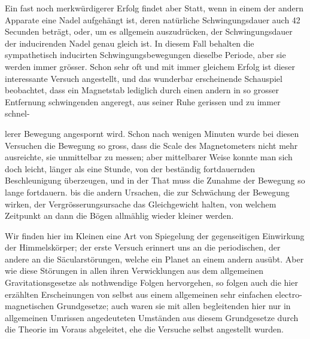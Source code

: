 Ein fast noch merkwürdigerer Erfolg findet aber Statt, wenn in einem der andern Apparate eine Nadel aufgehängt ist, deren natürliche Schwingungsdauer auch 42 Secunden beträgt, oder, um es allgemein auszudrücken, der Schwingungsdauer der inducirenden Nadel genau gleich ist. In diesem Fall behalten die sympathetisch inducirten Schwingungsbewegungen dieselbe Periode, aber sie werden immer grösser. Schon sehr oft und mit immer gleichem Erfolg ist dieser interessante Versuch angestellt, und das wunderbar erscheinende Schauspiel beobachtet, dass ein Magnetstab lediglich durch einen andern in so grosser Entfernung schwingenden angeregt, aus seiner Ruhe gerissen und zu immer schnel-\par\clearpage
{}
\noindent lerer Bewegung angespornt wird. Schon nach wenigen Minuten wurde bei diesen Versuchen die Bewegung so gross, dass die Scale des Magnetometers nicht mehr ausreichte, sie unmittelbar zu messen; aber mittelbarer Weise konnte man sich doch leicht, länger als eine Stunde, von der beständig fortdauernden Beschleunigung überzeugen, und in der That muss die Zunahme der Bewegung so lange fortdauern. bis die andern Ursachen, die zur Schwächung der Bewegung wirken, der Vergrösserungsursache das Gleichgewicht halten, von welchem Zeitpunkt an dann die Bögen allmählig wieder kleiner werden.

Wir finden hier im Kleinen eine Art von Spiegelung der gegenseitigen Einwirkung der Himmelskörper; der erste Versuch erinnert uns an die periodischen, der andere an die Säcularstörungen, welche ein Planet an einem andern ausübt. Aber wie diese Störungen in allen ihren Verwicklungen aus dem allgemeinen Gravitationsgesetze als nothwendige Folgen hervorgehen, so folgen auch die hier erzählten Erscheinungen von selbst aus einem allgemeinen sehr einfachen electro-magnetischen Grundgesetze; auch waren sie mit allen begleitenden hier nur in allgemeinen Umrissen angedeuteten Umständen aus diesem Grundgesetze durch die Theorie im Voraus abgeleitet, ehe die Versuche selbst angestellt wurden.

